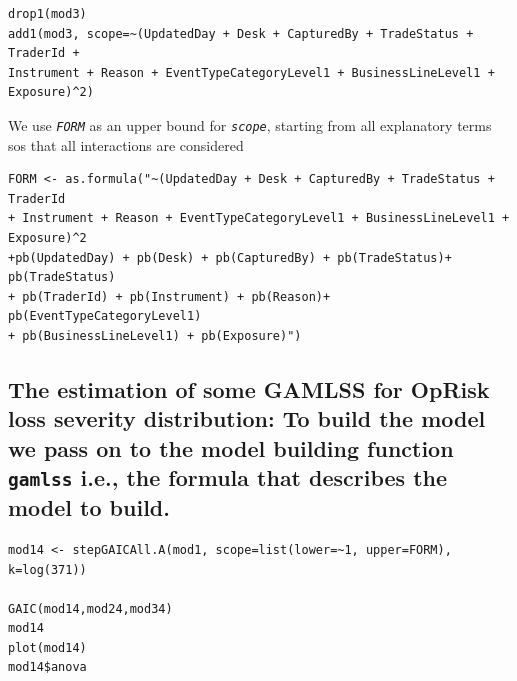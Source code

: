 \documentclass{DissertateUSU}
\begin{document}
\small

\begin{verbatim}
drop1(mod3)
add1(mod3, scope=~(UpdatedDay + Desk + CapturedBy + TradeStatus + TraderId +
Instrument + Reason + EventTypeCategoryLevel1 + BusinessLineLevel1 + Exposure)^2)
\end{verbatim}

\normalsize

We use \emph{\texttt{FORM}} as an upper bound for \emph{\texttt{scope}},
starting from all explanatory terms sos that all interactions are
considered

\small

\begin{verbatim}
FORM <- as.formula("~(UpdatedDay + Desk + CapturedBy + TradeStatus + TraderId
+ Instrument + Reason + EventTypeCategoryLevel1 + BusinessLineLevel1 + Exposure)^2
+pb(UpdatedDay) + pb(Desk) + pb(CapturedBy) + pb(TradeStatus)+ pb(TradeStatus)
+ pb(TraderId) + pb(Instrument) + pb(Reason)+ pb(EventTypeCategoryLevel1) 
+ pb(BusinessLineLevel1) + pb(Exposure)")
\end{verbatim}

\normalsize

\subsection{The estimation of some GAMLSS for OpRisk loss severity distribution: To build the model we pass on to the model building function \texttt{gamlss} i.e., the formula that describes the model to build.}
\label{sec:The estimation of some GAMLSS for OpRisk loss severity distribution}

\small

\begin{verbatim}
mod14 <- stepGAICAll.A(mod1, scope=list(lower=~1, upper=FORM), k=log(371))

GAIC(mod14,mod24,mod34)
mod14
plot(mod14)
mod14$anova
\end{verbatim}

\normalsize
\end{document}
